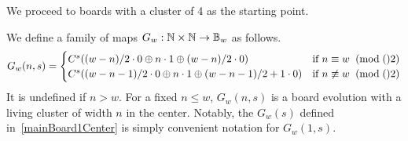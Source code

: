 \documentclass[12pt,letterpaper]{article}
\begin{document}
We proceed to boards with a cluster of 4 as the starting point.
\begin{dfn}\label{initCenterClusterBoards}
  We define a family of maps $G_w:\mathbb{N}\times \mathbb{N}\rightarrow \mathbb{B}_w$ as follows.
  \[ G_w(n,s)=\begin{cases}
      C^s((w-n)/2\cdot 0\oplus n\cdot 1\oplus (w-n)/2\cdot 0) & \text{if } n\equiv w \;\;(\operatorname{mod}\;()2) \\
      C^s((w-n-1)/2\cdot 0\oplus n\cdot 1\oplus (w-n-1)/2 + 1\cdot 0) & \text{if } n\not\equiv w \;\;(\operatorname{mod}\;()2) \end{cases} \]
  It is undefined if $n>w$. For a fixed $n\leq w$, $G_w(n, s)$ is a board evolution with a living cluster of width $n$ in the center. Notably, the $G_w(s)$ defined in~\cref{mainBoard1Center} is simply convenient notation for $G_w(1,s)$. 
\end{dfn}
\end{document}
